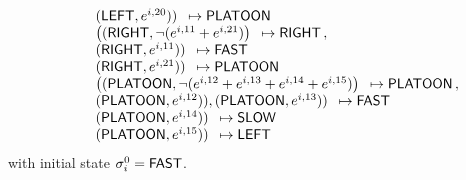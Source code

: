 \begin{equation*}
\begin{array}{rcl}
\\
& & \begin{array}{l} (\mleft, e^{i,20})) \end{array} \mapsto \mplatoon 
\\
& & \begin{array}{l} \left((\mright, \neg (e^{i,11} + e^{i, 21})\right) \end{array} \mapsto \mright \, , \\
& & \begin{array}{l} (\mright, e^{i,11})) \end{array} \mapsto \mfast 
\\
& & \begin{array}{l} (\mright, e^{i,21})) \end{array} \mapsto \mplatoon 
\\
& & \begin{array}{l} \left((\mplatoon, \neg (e^{i,12} + e^{i, 13} + e^{i, 14} + e^{i, 15})\right) \end{array} \mapsto \mplatoon \, , \\
& & \begin{array}{l} (\mplatoon, e^{i,12})), (\mplatoon, e^{i,13})) \end{array} \mapsto \mfast \\
& & \begin{array}{l} (\mplatoon, e^{i,14})) \end{array} \mapsto \mslow \\
& & \begin{array}{l} (\mplatoon, e^{i,15})) \end{array} \mapsto \mleft \\





\end{array}
\end{equation*}
with initial state $\sigma_i^0 = \mfast$.

